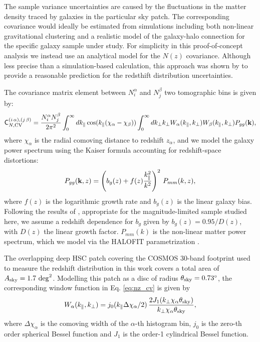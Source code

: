 \documentclass[a4paper,11pt]{article}
\begin{document}
        The sample variance uncertainties are caused by the fluctuations in the matter density traced by galaxies in the particular sky patch. The corresponding covariance would ideally be estimated from simulations including both non-linear gravitational clustering and a realistic model of the galaxy-halo connection for the specific galaxy sample under study. For simplicity in this proof-of-concept analysis we instead use an analytical model for the $N(z)$ covariance. Although less precise than a simulation-based calculation, this approach was shown by \cite{2004.09542} to provide a reasonable prediction for the redsthift distribution uncertainties.

        The covariance matrix element between $N^\alpha_i$ and $N^\beta_j$ two tomographic bins is given by:
        \begin{equation}\label{eq:nz_cv}
          {\sf C}_{N,{\rm CV}}^{(i\,\alpha),(j\,\beta)}=\frac{N^\alpha_iN^\beta_j}{2\pi^2} \int_0^\infty dk_\parallel \cos(k_\parallel(\chi_\alpha-\chi_\beta))\int_0^\infty dk_\perp k_\perp W_\alpha(k_\parallel,k_\perp)W_\beta(k_\parallel,k_\perp)P_{gg}({\bf k}),
        \end{equation}
        where $\chi_\alpha$ is the radial comoving distance to redshift $z_\alpha$, and we model the galaxy power spectrum using the Kaiser formula \cite{1987MNRAS.227....1K} accounting for redshift-space distortions:
        \begin{equation}
          P_{gg}({\bf k},z)=\left(b_g(z)+f(z)\frac{k_\parallel^2}{k^2}\right)^2\,P_{mm}(k,z),
        \end{equation}
        where $f(z)$ is the logarithmic growth rate and $b_g(z)$ is the linear galaxy bias. Following the results of \cite{1912.08209}, appropriate for the magnitude-limited sample studied here, we assume a redshift dependence for $b_g$ given by $b_g(z) = 0.95/D(z)$, with $D(z)$ the linear growth factor. $P_{mm}(k)$ is the non-linear matter power spectrum, which we model via the HALOFIT parametrization \cite{2003MNRAS.341.1311S,2012ApJ...761..152T}.

        The overlapping deep HSC patch covering the COSMOS 30-band footprint used to measure the redshift distribution in this work covers a total area of $A_{\rm sky} = 1.7 \ {\rm deg}^2$. Modelling this patch as a disc of radius $\theta_{\rm sky}=0.73^\circ$, the corresponding window function in Eq. \ref{eq:nz_cv} is given by
        \begin{equation}
          W_\alpha(k_\parallel,k_\perp)=j_0(k_\parallel\Delta\chi_\alpha/2)\,\frac{2 J_1(k_\perp \chi_\alpha\theta_{\rm sky})}{k_\perp \chi_\alpha\theta_{\rm sky}},
        \end{equation}
        where $\Delta\chi_\alpha$ is the comoving width of the $\alpha$-th histogram bin, $j_0$ is the zero-th order spherical Bessel function and $J_1$ is the order-1 cylindrical Bessel function.
\end{document}
